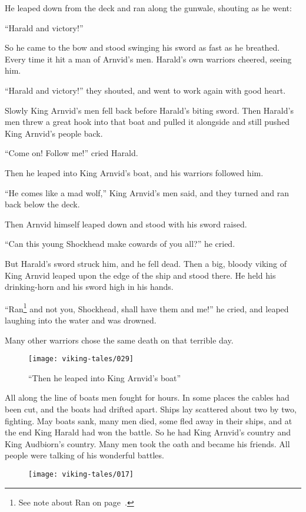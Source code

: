 He leaped down from the deck and ran along the gunwale, shouting as he
went:

``Harald and victory!''

So he came to the bow and stood swinging his sword as fast as he
breathed. Every time it hit a man of Arnvid's men. Harald's own warriors
cheered, seeing him.

``Harald and victory!'' they shouted, and went to work again with good
heart.

Slowly King Arnvid's men fell back before Harald's biting sword. Then
Harald's men threw a great hook into that boat and pulled it alongside
and still pushed King Arnvid's people back.

``Come on! Follow me!'' cried Harald.

Then he leaped into King Arnvid's boat, and his warriors followed him.

``He comes like a mad wolf,'' King Arnvid's men said, and they turned
and ran back below the deck.

Then Arnvid himself leaped down and stood with his sword raised.

``Can this young Shockhead make cowards of you all?'' he cried.

But Harald's sword struck him, and he fell dead. Then a big, bloody
viking of King Arnvid leaped upon the edge of the ship and stood there.
He held his drinking-horn and his sword high in his hands.

``Ran\footnote{See note about Ran on page~\pageref{ran}.} and not you,
Shockhead, shall have them and me!'' he cried, and leaped laughing into
the water and was drowned.

Many other warriors chose the same death on that terrible day.

\begin{figure}
    \centering
    \texttt{[image: viking-tales/029]}
    \caption{``Then he leaped into King Arnvid's boat''}
\end{figure}

All along the line of boats men fought for hours. In some places the
cables had been cut, and the boats had drifted apart. Ships lay
scattered about two by two, fighting. May boats sank, many men died,
some fled away in their ships, and at the end King Harald had won the
battle. So he had King Arnvid's country and King Audbiorn's country.
Many men took the oath and became his friends. All people were talking
of his wonderful battles.

\begin{figure}[hb]
    \centering
    \vskip8pt
    \texttt{[image: viking-tales/017]}
\end{figure}
